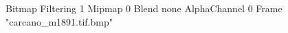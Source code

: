 {Bitmap
	{Filtering 1}
	{Mipmap 0}
	{Blend none}
	{AlphaChannel 0}
	{Frame "carcano_m1891.tif.bmp"}
}
